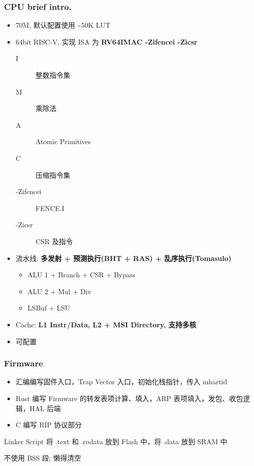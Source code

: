 \documentclass[UTF-8]{ctexbeamer}
\begin{document}
\begin{frame}
  \frametitle{CPU brief intro.}

  \begin{itemize}
    \item 70M, 默认配置使用 \textasciitilde 50K LUT
    \pause
    \item 64bit RISC-V, 实现 ISA 为 \textbf{RV64IMAC -Zifencei -Zicsr}
    \begin{description}
      \item[I] 整数指令集
      \item[M] 乘除法
      \item[A] Atomic Primitives
      \item[C] 压缩指令集
      \item[-Zifencei] FENCE.I
      \item[-Zicsr] CSR 及指令
    \end{description}
    \pause
    \item 流水线: \textbf{多发射 + 预测执行(BHT + RAS) + 乱序执行(Tomasulo)}
    \begin{itemize}
      \item ALU 1 + Branch + CSR + Bypass
      \item ALU 2 + Mul + Div
      \item LSBuf + LSU
    \end{itemize}
    \pause
    \item Cache: \textbf{L1 Instr/Data, L2 + MSI Directory, 支持多核}
    \item 可配置
  \end{itemize}
\end{frame}

\begin{frame}
  \frametitle{Firmware}

  \begin{itemize}
    \item 汇编编写固件入口，Trap Vector 入口，初始化栈指针，传入 mhartid
    \item Rust 编写 Firmware 的转发表项计算、填入，ARP 表项填入，发包、收包逻辑，HAL 后端
    \item C 编写 RIP 协议部分
  \end{itemize}

  Linker Script 将 .text 和 .rodata 放到 Flash 中，将 .data 放到 SRAM 中

  不使用 BSS 段: 懒得清空
\end{frame}
\end{document}
